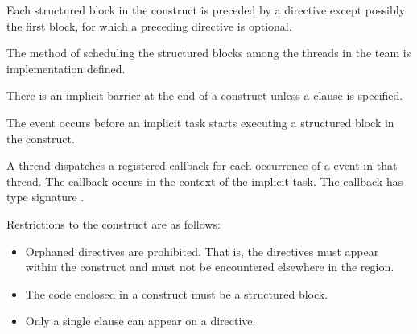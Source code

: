 \descr
Each structured block in the  construct is preceded by a  directive
except possibly the first block, for which a preceding  directive is optional.

The method of scheduling the structured blocks among the threads in the team is
implementation defined.

There is an implicit barrier at the end of a  construct unless a 
clause is specified.



The  event occurs before an implicit task starts
executing a structured block in the  construct.


A thread dispatches a registered 
callback for each occurrence of a  
event in that thread. The callback occurs in the
context of the implicit task.  The callback has type signature
. 

\restrictions
Restrictions to the  construct are as follows:

\begin{itemize}
\item Orphaned  directives are prohibited. That is, the  directives must
appear within the  construct and must not be encountered elsewhere in the
 region.

\item The code enclosed in a  construct must be a structured block.

\item Only a single  clause can appear on a  directive.

\end{itemize}

